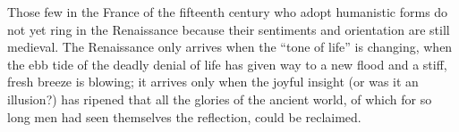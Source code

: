 Those few in the France of the fifteenth century who adopt humanistic
forms do not yet ring in the Renaissance because their sentiments and
orientation are still medieval. The Renaissance only arrives when the
``tone of life'' is changing, when the ebb tide of the deadly denial of
life has given way to a new flood and a stiff, fresh breeze is blowing;
it arrives only when the joyful insight (or was it an illusion?) has
ripened that all the glories of the ancient world, of which for so long
men had seen themselves the reflection, could be reclaimed.

